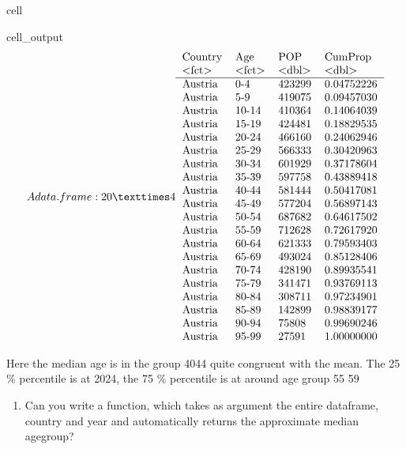 \documentclass[letterpaper,10pt,english]{jupyterBook}
\begin{document}
\begin{sphinxuseclass}{cell}
\begin{sphinxVerbatimOutput}
\begin{sphinxuseclass}{cell_output}\begin{equation*}
\begin{split}A data.frame: 20 × 4
\begin{tabular}{llll}
 Country & Age & POP & CumProp\\
 <fct> & <fct> & <dbl> & <dbl>\\
\hline
	 Austria & 0-4   & 423299 & 0.04752226\\
	 Austria & 5-9   & 419075 & 0.09457030\\
	 Austria & 10-14 & 410364 & 0.14064039\\
	 Austria & 15-19 & 424481 & 0.18829535\\
	 Austria & 20-24 & 466160 & 0.24062946\\
	 Austria & 25-29 & 566333 & 0.30420963\\
	 Austria & 30-34 & 601929 & 0.37178604\\
	 Austria & 35-39 & 597758 & 0.43889418\\
	 Austria & 40-44 & 581444 & 0.50417081\\
	 Austria & 45-49 & 577204 & 0.56897143\\
	 Austria & 50-54 & 687682 & 0.64617502\\
	 Austria & 55-59 & 712628 & 0.72617920\\
	 Austria & 60-64 & 621333 & 0.79593403\\
	 Austria & 65-69 & 493024 & 0.85128406\\
	 Austria & 70-74 & 428190 & 0.89935541\\
	 Austria & 75-79 & 341471 & 0.93769113\\
	 Austria & 80-84 & 308711 & 0.97234901\\
	 Austria & 85-89 & 142899 & 0.98839177\\
	 Austria & 90-94 &  75808 & 0.99690246\\
	 Austria & 95-99 &  27591 & 1.00000000\\
\end{tabular}\end{split}
\end{equation*}
\end{sphinxuseclass}\end{sphinxVerbatimOutput}

\end{sphinxuseclass}
\sphinxAtStartPar
Here the median age is in the group 40\sphinxhyphen{}44 quite congruent with the mean. The 25 \% percentile is at 20\sphinxhyphen{}24, the 75 \% percentile is at around age group 55 \sphinxhyphen{} 59
\begin{enumerate}
%
\setcounter{enumi}{1}
\item {} 
\sphinxAtStartPar
Can you write a function, which takes as argument the entire dataframe, country and year and automatically returns the approximate median age\sphinxhyphen{}group?

\end{enumerate}
\end{document}
